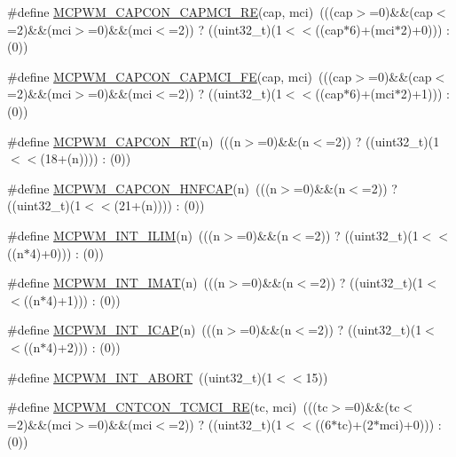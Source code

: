 \begin{DoxyCompactItemize}
\item 
\#define \hyperlink{group___m_c_p_w_m___private___macros_ga986f84ea94cd540ea34e925cbd684791}{\-M\-C\-P\-W\-M\-\_\-\-C\-A\-P\-C\-O\-N\-\_\-\-C\-A\-P\-M\-C\-I\-\_\-\-R\-E}(cap, mci)~(((cap$>$=0)\&\&(cap$<$=2)\&\&(mci$>$=0)\&\&(mci$<$=2)) ? ((uint32\-\_\-t)(1$<$$<$((cap$\ast$6)+(mci$\ast$2)+0))) \-: (0))
\item 
\#define \hyperlink{group___m_c_p_w_m___private___macros_ga4677d0998df3d56f970b3181a967901e}{\-M\-C\-P\-W\-M\-\_\-\-C\-A\-P\-C\-O\-N\-\_\-\-C\-A\-P\-M\-C\-I\-\_\-\-F\-E}(cap, mci)~(((cap$>$=0)\&\&(cap$<$=2)\&\&(mci$>$=0)\&\&(mci$<$=2)) ? ((uint32\-\_\-t)(1$<$$<$((cap$\ast$6)+(mci$\ast$2)+1))) \-: (0))
\item 
\#define \hyperlink{group___m_c_p_w_m___private___macros_gaf90554fc678dfe34862d7cf46e8b77b9}{\-M\-C\-P\-W\-M\-\_\-\-C\-A\-P\-C\-O\-N\-\_\-\-R\-T}(n)~(((n$>$=0)\&\&(n$<$=2)) ? ((uint32\-\_\-t)(1$<$$<$(18+(n)))) \-: (0))
\item 
\#define \hyperlink{group___m_c_p_w_m___private___macros_gaefc40e8c78b8bf5ed358c3ec971e40ee}{\-M\-C\-P\-W\-M\-\_\-\-C\-A\-P\-C\-O\-N\-\_\-\-H\-N\-F\-C\-A\-P}(n)~(((n$>$=0)\&\&(n$<$=2)) ? ((uint32\-\_\-t)(1$<$$<$(21+(n)))) \-: (0))
\item 
\#define \hyperlink{group___m_c_p_w_m___private___macros_ga47b2ecdf72df74b779870bc0ba4e94ce}{\-M\-C\-P\-W\-M\-\_\-\-I\-N\-T\-\_\-\-I\-L\-I\-M}(n)~(((n$>$=0)\&\&(n$<$=2)) ? ((uint32\-\_\-t)(1$<$$<$((n$\ast$4)+0))) \-: (0))
\item 
\#define \hyperlink{group___m_c_p_w_m___private___macros_ga82c128589c028ca5ad7d7c5bc4391805}{\-M\-C\-P\-W\-M\-\_\-\-I\-N\-T\-\_\-\-I\-M\-A\-T}(n)~(((n$>$=0)\&\&(n$<$=2)) ? ((uint32\-\_\-t)(1$<$$<$((n$\ast$4)+1))) \-: (0))
\item 
\#define \hyperlink{group___m_c_p_w_m___private___macros_ga1879c9dcab254e222691496618e6fc53}{\-M\-C\-P\-W\-M\-\_\-\-I\-N\-T\-\_\-\-I\-C\-A\-P}(n)~(((n$>$=0)\&\&(n$<$=2)) ? ((uint32\-\_\-t)(1$<$$<$((n$\ast$4)+2))) \-: (0))
\item 
\#define \hyperlink{group___m_c_p_w_m___private___macros_gafd0c9d24a856c464d45b93d9edaa7d3e}{\-M\-C\-P\-W\-M\-\_\-\-I\-N\-T\-\_\-\-A\-B\-O\-R\-T}~((uint32\-\_\-t)(1$<$$<$15))
\item 
\#define \hyperlink{group___m_c_p_w_m___private___macros_ga1b0dd26a880113087ce03b6bb9ada7df}{\-M\-C\-P\-W\-M\-\_\-\-C\-N\-T\-C\-O\-N\-\_\-\-T\-C\-M\-C\-I\-\_\-\-R\-E}(tc, mci)~(((tc$>$=0)\&\&(tc$<$=2)\&\&(mci$>$=0)\&\&(mci$<$=2)) ? ((uint32\-\_\-t)(1$<$$<$((6$\ast$tc)+(2$\ast$mci)+0))) \-: (0))
$$
\end{DoxyCompactItemize}
